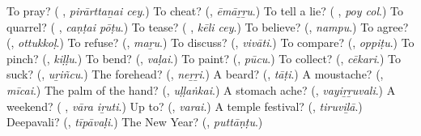 \begin{tcolorbox}[breakable,colback=teal!4,colframe=teal!35!black,title={Before you move on}]
To pray? (\textbf{ }, \emph{pirārttaṉai cey}.) To cheat? (\textbf{}, \emph{ēmāṟṟu}.) To tell a lie? (\textbf{ }, \emph{poy col}.) To quarrel? (\textbf{ }, \emph{caṇṭai pōṭu}.) To tease? (\textbf{ }, \emph{kēli cey}.) To believe? (\textbf{}, \emph{nampu}.) To agree? (\textbf{}, \emph{ottukkoḷ}.) To refuse? (\textbf{}, \emph{maṟu}.) To discuss? (\textbf{}, \emph{vivāti}.) To compare? (\textbf{}, \emph{oppiṭu}.) To pinch? (\textbf{}, \emph{kiḷḷu}.) To bend? (\textbf{}, \emph{vaḷai}.) To paint? (\textbf{}, \emph{pūcu}.) To collect? (\textbf{}, \emph{cēkari}.) To suck? (\textbf{}, \emph{uṟiñcu}.) The forehead? (\textbf{}, \emph{neṟṟi}.) A beard? (\textbf{}, \emph{tāṭi}.) A moustache? (\textbf{}, \emph{mīcai}.) The palm of the hand? (\textbf{}, \emph{uḷḷaṅkai}.) A stomach ache? (\textbf{}, \emph{vayiṟṟuvali}.) A weekend? (\textbf{ }, \emph{vāra iṟuti}.) Up to? (\textbf{}, \emph{varai}.) A temple festival? (\textbf{}, \emph{tiruviḻā}.) Deepavali? (\textbf{}, \emph{tīpāvaḷi}.) The New Year? (\textbf{}, \emph{puttāṇṭu}.)
\end{tcolorbox}
